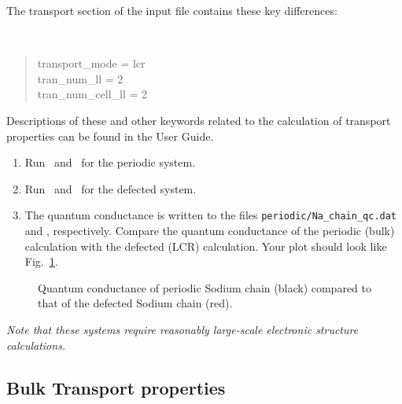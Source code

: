 \documentclass[a4paper,11pt,twoside]{article}
\begin{document}
The transport section of the input file contains these key differences:

{\tt
\begin{quote}
transport\_mode = lcr\\
tran\_num\_ll = 2\\
tran\_num\_cell\_ll = 2\\

\end{quote} }

Descriptions of these and other keywords related to the calculation of
transport properties can be found in the User Guide.

\begin{enumerate}
\item Run \pwscf\ and \wannier\ for the periodic system.
\item Run \pwscf\ and \wannier\ for the defected system.
\item The quantum conductance is written to the files {\tt periodic/Na\_chain\_qc.dat} 
and , respectively. 
Compare the quantum conductance of the periodic (bulk) calculation with the
defected (LCR) calculation. Your plot should look like Fig.~\ref{fig:Na_qc}.
\end{enumerate}


\begin{figure}[h]
\begin{center}
\scalebox{0.3}{\texttt{[image: Na\_qc]}}
\caption{Quantum conductance of periodic Sodium chain (black) compared to that of the defected Sodium chain (red).}
\label{fig:Na_qc}
\end{center}
\end{figure}



\emph{Note that these systems require reasonably large-scale electronic 
structure calculations.}

\subsection*{Bulk Transport properties}
\end{document}
